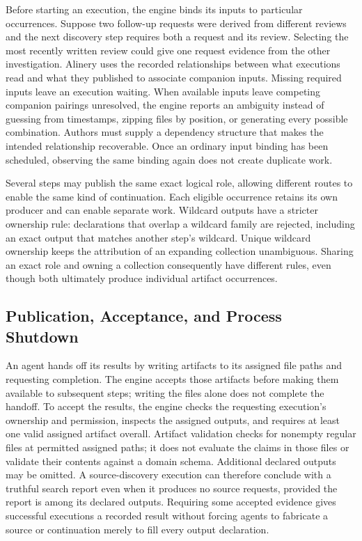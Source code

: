 \documentclass[letterpaper]{article}
\theoremstyle{definition}
\begin{document}
Before starting an execution, the engine binds its inputs to particular
occurrences. Suppose two follow-up requests were derived from different
reviews and the next discovery step requires both a request and its review.
Selecting the most recently written review could give one request evidence
from the other investigation. Alinery uses the recorded relationships
between what executions read and what they published to associate companion
inputs. Missing required inputs leave an execution waiting. When available
inputs leave competing companion pairings unresolved, the engine reports
an ambiguity instead of guessing from timestamps,
zipping files by position, or generating every possible combination.
Authors must supply a dependency structure that makes the intended
relationship recoverable. Once an ordinary input binding has been
scheduled, observing the same binding again does not create duplicate work.

Several steps may publish the same exact logical role, allowing different
routes to enable the same kind of continuation. Each eligible occurrence
retains its own producer and can enable separate work. Wildcard outputs have
a stricter ownership rule: declarations that overlap a wildcard family are
rejected, including an exact output that matches another step's wildcard.
Unique wildcard ownership keeps the attribution of an expanding collection
unambiguous. Sharing an exact role and owning a collection consequently
have different rules, even though both ultimately produce individual
artifact occurrences.

\subsection{Publication, Acceptance, and Process Shutdown}

An agent hands off its results by writing artifacts to its assigned file
paths and requesting completion. The engine accepts those artifacts before
making them available to subsequent steps; writing the files alone does not
complete the handoff. To accept the results, the engine checks the requesting execution's ownership
and permission, inspects the assigned outputs, and requires at least one
valid assigned artifact overall. Artifact validation checks for nonempty
regular files at permitted assigned paths; it does not evaluate the claims
in those files or validate their contents against a domain schema.
Additional declared outputs may be
omitted. A source-discovery execution can therefore conclude with a
truthful search report even when it produces no source requests, provided
the report is among its declared outputs. Requiring some accepted evidence
gives successful executions a recorded result without forcing agents to
fabricate a source or continuation merely to fill every output declaration.
\end{document}
